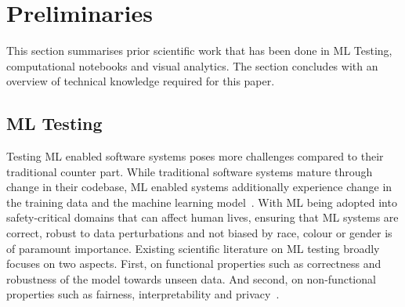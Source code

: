 

\section{Preliminaries}\label{sec:prelim}

This section summarises prior scientific work that has been done in ML
Testing, computational notebooks and visual analytics. The section
concludes with an overview of technical knowledge required for this
paper.

\subsection{ML Testing}\label{sec:ml-testing}

Testing ML enabled software systems poses more challenges compared to
their traditional counter part. While traditional software systems
mature through change in their codebase, ML enabled systems
additionally experience change in the training data and the machine
learning
model~\cite{sculley2015hidden,amershi2019software,sambasivan2021everyone}.
With ML being adopted into safety-critical domains that can affect
human lives, ensuring that ML systems are correct, robust to data
perturbations and not biased by race, colour or gender is of paramount
importance. Existing scientific literature on ML testing broadly
focuses on two aspects. First, on functional properties such as
correctness and robustness of the model towards unseen data. And
second, on non-functional properties such as fairness,
interpretability and
privacy~\cite{zhang2020machine,mehrabi2021survey,chen2022fairness}.

